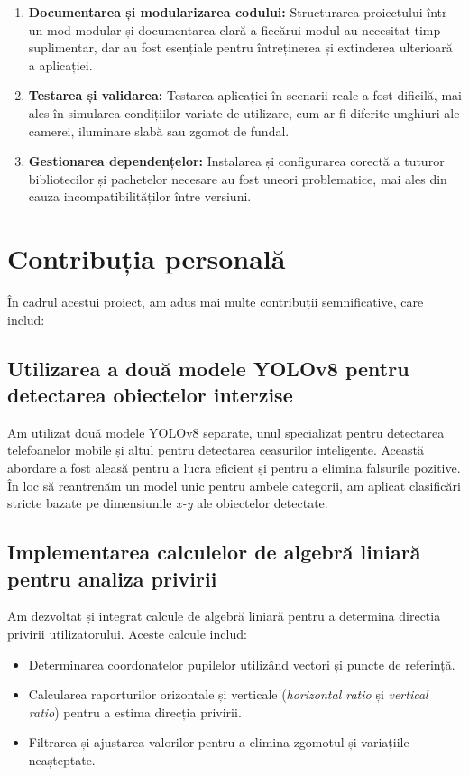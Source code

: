 \documentclass[12pt,a4paper]{article}
\begin{document}
\begin{enumerate}
    \item \textbf{Documentarea și modularizarea codului:} Structurarea proiectului într-un mod modular și documentarea clară a fiecărui modul au necesitat timp suplimentar, dar au fost esențiale pentru întreținerea și extinderea ulterioară a aplicației.

    \item \textbf{Testarea și validarea:} Testarea aplicației în scenarii reale a fost dificilă, mai ales în simularea condițiilor variate de utilizare, cum ar fi diferite unghiuri ale camerei, iluminare slabă sau zgomot de fundal.

    \item \textbf{Gestionarea dependențelor:} Instalarea și configurarea corectă a tuturor bibliotecilor și pachetelor necesare au fost uneori problematice, mai ales din cauza incompatibilităților între versiuni.
\end{enumerate}

\section{Contribuția personală}

În cadrul acestui proiect, am adus mai multe contribuții semnificative, care includ:

\subsection{Utilizarea a două modele YOLOv8 pentru detectarea obiectelor interzise}
Am utilizat două modele YOLOv8 separate, unul specializat pentru detectarea telefoanelor mobile și altul pentru detectarea ceasurilor inteligente. Această abordare a fost aleasă pentru a lucra eficient și pentru a elimina falsurile pozitive. În loc să reantrenăm un model unic pentru ambele categorii, am aplicat clasificări stricte bazate pe dimensiunile \textit{x-y} ale obiectelor detectate.

\subsection{Implementarea calculelor de algebră liniară pentru analiza privirii}
Am dezvoltat și integrat calcule de algebră liniară pentru a determina direcția privirii utilizatorului. Aceste calcule includ:
\begin{itemize}
    \item Determinarea coordonatelor pupilelor utilizând vectori și puncte de referință.
    \item Calcularea raporturilor orizontale și verticale (\textit{horizontal ratio} și \textit{vertical ratio}) pentru a estima direcția privirii.
    \item Filtrarea și ajustarea valorilor pentru a elimina zgomotul și variațiile neașteptate.
\end{itemize}
\end{document}
